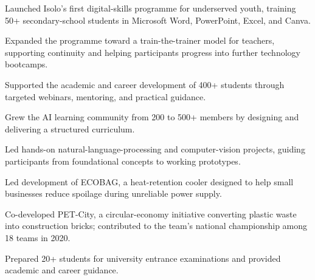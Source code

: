 
\begin{details}
    \item Launched Isolo's first digital-skills programme for underserved youth, training 50+ secondary-school students in Microsoft Word, PowerPoint, Excel, and Canva.
    \item Expanded the programme toward a train-the-trainer model for teachers, supporting continuity and helping participants progress into further technology bootcamps.
\end{details}

\begin{details}
    \item Supported the academic and career development of 400+ students through targeted webinars, mentoring, and practical guidance.
\end{details}

\begin{details}
    \item Grew the AI learning community from 200 to 500+ members by designing and delivering a structured curriculum.
    \item Led hands-on natural-language-processing and computer-vision projects, guiding participants from foundational concepts to working prototypes.
\end{details}

\begin{details}
    \item Led development of ECOBAG, a heat-retention cooler designed to help small businesses reduce spoilage during unreliable power supply.
    \item Co-developed PET-City, a circular-economy initiative converting plastic waste into construction bricks; contributed to the team's national championship among 18 teams in 2020.
\end{details}

\begin{details}
    \item Prepared 20+ students for university entrance examinations and provided academic and career guidance.
\end{details}
